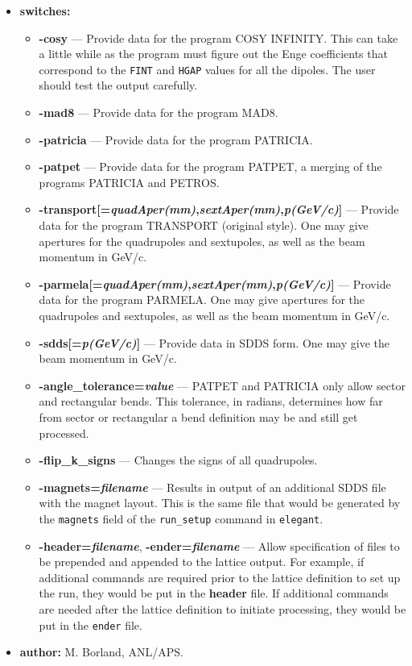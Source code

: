 \documentclass[11pt]{article}
\begin{document}
\begin{itemize}
\item {\bf switches:}
\begin{itemize}
\item {\bf -cosy} --- Provide data for the program COSY INFINITY.  This can take a little while
  as the program must figure out the Enge coefficients that correspond to the {\tt FINT} and
  {\tt HGAP} values for all the dipoles.  The user should test the output carefully.
\item {\bf -mad8} --- Provide data for the program MAD8.
\item {\bf -patricia} --- Provide data for the program PATRICIA.
\item {\bf -patpet} --- Provide data for the program PATPET, a merging of the programs
        PATRICIA and PETROS.
\item {\bf -transport[={\em quadAper(mm)},{\em sextAper(mm)},{\em p(GeV/c)}]} --- 
        Provide data for the program TRANSPORT (original style). 
	One may give apertures for
        the quadrupoles and sextupoles, as well as the beam momentum in GeV/c.
\item {\bf -parmela[={\em quadAper(mm)},{\em sextAper(mm)},{\em p(GeV/c)}]} --- 
        Provide data for the program PARMELA. One may give apertures for
        the quadrupoles and sextupoles, as well as the beam momentum in GeV/c.
\item {\bf -sdds[={\em p(GeV/c)}]} --- Provide data in SDDS form.  One may give the beam momentum in GeV/c.
\item {\bf -angle\_tolerance={\em value}}  --- PATPET and PATRICIA only allow sector and rectangular bends.
        This tolerance, in radians, determines how far from sector or rectangular a bend 
        definition may be and still get processed.
\item {\bf -flip\_k\_signs} --- Changes the signs of all quadrupoles.
\item {\bf -magnets={\em filename}} --- Results in output of an additional SDDS file with the magnet layout.
        This is the same file that would be generated by the {\tt magnets} field of the 
        {\tt run\_setup} command in {\tt elegant}.
\item {\bf -header={\em filename}}, {\bf -ender={\em filename}} --- 
        Allow specification of files to be prepended and appended to
        the lattice output.  For example, if additional commands are required prior to the
        lattice definition to set up the run, they would be put in the {\bf header} file.
        If additional commands are needed after the lattice definition to initiate processing, they 
        would be put in the {\tt ender} file.
\end{itemize}

\item {\bf author:} M. Borland, ANL/APS.
\end{itemize}
\end{document}
